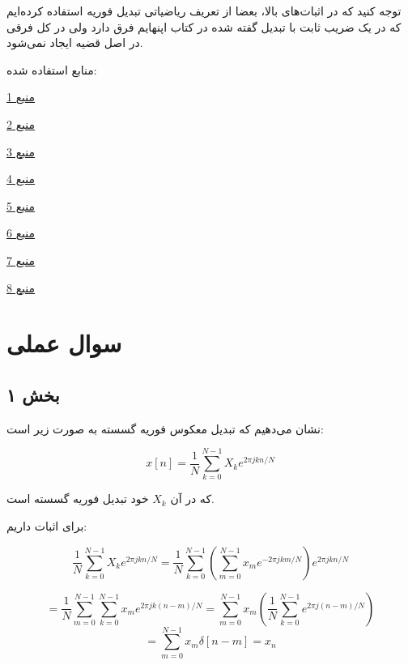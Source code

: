 \documentclass[12pt]{article}
\begin{document}
 
 توجه کنید که در اثبات‌های بالا، بعضا از تعریف ریاضیاتی تبدیل فوریه استفاده کرده‌ایم که در یک ضریب ثابت با تبدیل گفته شده در کتاب اپنهایم فرق دارد ولی در کل فرقی در اصل قضیه ایجاد نمی‌شود.
 
 
 
 منابع استفاده شده:
 
  \href{https://en.wikipedia.org/wiki/Plancherel_theorem}{منبع 1}

 \href{https://en.wikipedia.org/wiki/Parseval\%27s_identity}{منبع 2}
 
  \href{https://en.wikipedia.org/wiki/Parseval\%27s_theorem}{منبع 3}

 \href{https://math.stackexchange.com/questions/2024619/fourier-transform-is-a-bijective-transformation}{منبع 4}

 \href{https://mathworld.wolfram.com/PlancherelsTheorem.html}{منبع 5}
 
  \href{https://mathworld.wolfram.com/ParsevalsTheorem.html}{منبع 6}
  
   \href{https://web.stanford.edu/class/ee102/lectures/fourtran}{منبع 7}
   
    \href{https://www.cs.uaf.edu/~bueler/M611heaviside.pdf}{منبع 8}
 \newpage
\section{سوال عملی}

\subsection{بخش ۱}

نشان می‌دهیم که تبدیل معکوس فوریه گسسته به صورت زیر است:

$$x[n] = \frac{1}{N} \sum_{k=0}^{N-1} X_k e^{2\pi j k n / N}$$

که در آن $X_k$ خود تبدیل فوریه گسسته است.

برای اثبات داریم:

$$\frac{1}{N} \sum_{k=0}^{N-1} X_k e^{2\pi j k n /N} = \frac{1}{N} \sum_{k=0}^{N-1}(\sum_{m=0}^{N-1} x_m e^{- 2\pi j k m/N})e^{2 \pi j k n /N}$$

$$= \frac{1}{N}\sum_{m=0}^{N-1}\sum_{k=0}^{N-1} x_m e^{2\pi j k(n-m)/N} = \sum_{m=0}^{N-1} x_m (\frac{1}{N} \sum_{k=0}^{N-1} e^{2 \pi j (n-m)/N})$$
$$=\sum_{m=0}^{N-1} x_m \delta[n-m] = x_n$$

 
\end{document}
